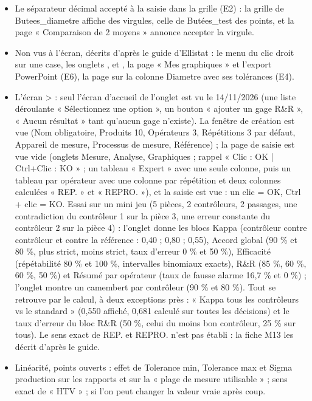 \documentclass[10pt,a4paper]{article}
\begin{document}
\begin{tcolorbox}[verif]
\begin{itemize}
\item Le séparateur décimal accepté à la saisie dans la grille (E2) : la grille de Butees\_diametre affiche des virgules, celle de Butées\_test des points, et la page « Comparaison de 2 moyens » annonce accepter la virgule.
\item Non vus à l'écran, décrits d'après le guide d'Ellistat : le menu du clic droit sur une case, les onglets ,  et , la page « Mes graphiques » et l'export PowerPoint (E6), la page  sur la colonne Diametre avec ses tolérances (E4).
\item L'écran  >  : seul l'écran d'accueil de l'onglet est vu le 14/11/2026 (une liste déroulante « Sélectionnez une option », un bouton « ajouter un gage R\&R », « Aucun résultat » tant qu'aucun gage n'existe). La fenêtre de création est vue (Nom obligatoire, Produits 10, Opérateurs 3, Répétitions 3 par défaut, Appareil de mesure, Processus de mesure, Référence) ; la page de saisie est vue vide (onglets Mesure, Analyse, Graphiques ; rappel « Clic : OK | Ctrl+Clic : KO » ; un tableau « Expert » avec une seule colonne, puis un tableau par opérateur avec une colonne par répétition et deux colonnes calculées « REP. » et « REPRO. »), et la saisie est vue : un clic = OK, Ctrl + clic = KO. Essai sur un mini jeu (5 pièces, 2 contrôleurs, 2 passages, une contradiction du contrôleur 1 sur la pièce 3, une erreur constante du contrôleur 2 sur la pièce 4) : l'onglet  donne les blocs Kappa (contrôleur contre contrôleur et contre la référence : 0,40 ; 0,80 ; 0,55), Accord global (90 \% et 80 \%, plus strict, moins strict, taux d'erreur 0 \% et 50 \%), Efficacité (répétabilité 80 \% et 100 \%, intervalles binomiaux exacts), R\&R (85 \%, 60 \%, 60 \%, 50 \%) et Résumé par opérateur (taux de fausse alarme 16,7 \% et 0 \%) ; l'onglet  montre un camembert par contrôleur (90 \% et 80 \%). Tout se retrouve par le calcul, à deux exceptions près : « Kappa tous les contrôleurs vs le standard » (0,550 affiché, 0,681 calculé sur toutes les décisions) et le taux d'erreur du bloc R\&R (50 \%, celui du moins bon contrôleur, 25 \% sur tous). Le sens exact de REP. et REPRO. n'est pas établi : la fiche M13 les décrit d'après le guide.
\item Linéarité, points ouverts : effet de Tolerance min, Tolerance max et Sigma production sur les rapports et sur la « plage de mesure utilisable » ; sens exact de « HTV » ; si l'on peut changer la valeur vraie après coup.

\end{itemize}
\end{tcolorbox}
\end{document}
